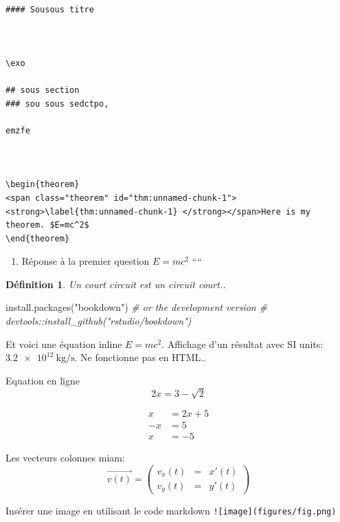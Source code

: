 \documentclass[
]{book}
\newenvironment{Shaded}{\begin{snugshade}}{\end{snugshade}}
\newcommand{\CommentTok}[1]{\textcolor[rgb]{0.56,0.35,0.01}{\textit{#1}}}
\newcommand{\FunctionTok}[1]{\textcolor[rgb]{0.00,0.00,0.00}{#1}}
\newcommand{\NormalTok}[1]{#1}
\newcommand{\StringTok}[1]{\textcolor[rgb]{0.31,0.60,0.02}{#1}}
\providecommand{\tightlist}{%
  \setlength{\itemsep}{0pt}\setlength{\parskip}{0pt}}
\newtheorem{definition}{Définition}
\newtheorem{theorem}{Application}
\def\tightlist{}
\newcounter{numeroexo}
\newcommand{\exo}{\par\noindent\stepcounter{numeroexo}
	\hspace{-.25cm}\fbox{\textbf{Exercice \arabic{numeroexo}}}\quad}
\begin{document}
\begin{verbatim}

#### Sousous titre



\exo 

## sous section
### sou sous sedctpo,

emzfe



\begin{theorem}
<span class="theorem" id="thm:unnamed-chunk-1"><strong>\label{thm:unnamed-chunk-1} </strong></span>Here is my theorem. $E=mc^2$
\end{theorem}
\end{verbatim}

\begin{enumerate}
\def\labelenumi{\arabic{enumi}.}
\tightlist
\item
  Réponse à la premier question \(E=mc^2\)
  ````
\end{enumerate}

\begin{definition}
\protect\hypertarget{def:unnamed-chunk-2}{}{\label{def:unnamed-chunk-2} }Un court circuit est un circuit court..
\end{definition}

\begin{Shaded}
\begin{Highlighting}[]
\FunctionTok{install.packages}\NormalTok{(}\StringTok{"bookdown"}\NormalTok{)}
\CommentTok{\# or the development version}
\CommentTok{\# devtools::install\_github("rstudio/bookdown")}
\end{Highlighting}
\end{Shaded}

Et voici une équation inline \(E=mc^2\). Affichage d'un résultat avec SI units: \(\SI{3.2e12}{\kilo\gram\per\second}\). Ne fonctionne pas en HTML..

Equation en ligne \[2x  = 3 -\sqrt{2}\]

\begin{align}
x &= 2x +5 \\
-x &= 5 \\
x &= -5 
\end{align}

Les vecteurs colonnes miam:
\[\overrightarrow{v(t)} = \begin{pmatrix}v_x(t) &=& x'(t)\\
v_y(t) &=& y'(t)
\end{pmatrix}\]

Insérer une image en utilisant le code markdown
\texttt{!{[}image{]}(figures/fig.png)}
\end{document}
